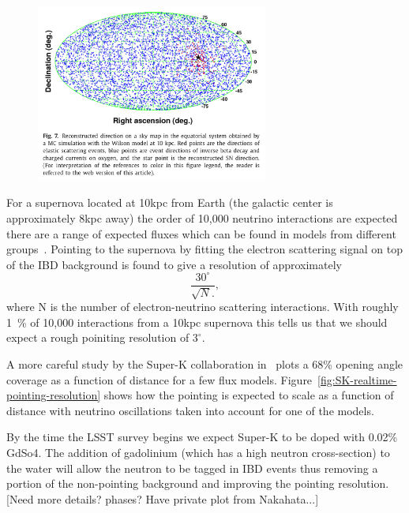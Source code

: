 \documentclass[11pt]{article}
\newcommand{\superk}  {Super\nobreakdash-K\xspace}
\begin{document}
\begin{figure}
  \begin{center}
    \includegraphics[width=3.0in]{SK-realtime-monitor-pointing}
    \caption{}
    \label{fig:SK-realtime-monitor-pointing}
  \end{center}
\end{figure}

For a supernova located at 10kpc from Earth (the galactic center is
approximately 8kpc away) the order of 10,000 neutrino interactions are
expected there are a range of expected fluxes which can be found in
models from different groups~\cite{model_references}.  Pointing to the
supernova by fitting the electron scattering signal on top of the IBD
background is found to give a resolution of approximately
%
$$ \frac{30^\circ}{\sqrt{N}.}, $$
%
where N is the number of electron-neutrino scattering interactions.
With roughly 1~\% of 10,000 interactions from a 10kpc supernova this
tells us that we should expect a rough poiniting resolution of $3^\circ$.


A more careful study by the \superk collaboration
in~\cite{2016APh....81...39A} plots a 68\% opening angle coverage as a
function of distance for a few flux
models. Figure~\ref{fig:SK-realtime-pointing-resolution} shows how the
pointing is expected to scale as a function of distance with neutrino
oscillations taken into account for one of the models.

By the time the LSST survey begins we expect \superk to be doped with
0.02\% GdSo4.  The addition of gadolinium (which has a high neutron
cross-section) to the water will allow the neutron to be tagged in IBD
events thus removing a portion of the non-pointing background and
improving the pointing resolution. [Need more details? phases? Have
private plot from Nakahata...]
\end{document}
